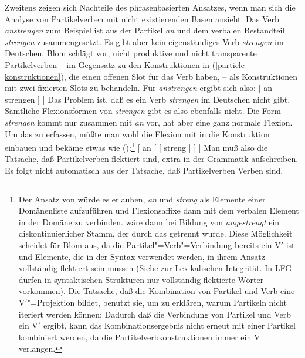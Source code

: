 Zweitens zeigen sich Nachteile des phrasenbasierten Ansatzes, wenn man sich
die Analyse von Partikelverben mit nicht existierenden Basen ansieht:
Das Verb \emph{anstrengen} zum Beispiel ist aus der Partikel \emph{an}
und dem verbalen Bestandteil \emph{strengen} zusammengesetzt. Es gibt
aber kein eigenständiges Verb \emph{strengen} im Deutschen. Blom
schlägt vor, nicht produktive und nicht transparente Partikelverben
-- im Gegensatz zu den Konstruktionen in (\ref{particle-konstruktionen}),
die einen offenen Slot für das Verb haben, -- als Konstruktionen mit zwei
fixierten Slots zu behandeln. Für \emph{anstrengen} ergibt sich also:
\ea 
{}[ an   [ strengen ] ]
\z
Das Problem ist, daß es ein Verb \emph{strengen} im Deutschen nicht gibt.
Sämtliche Flexionsformen von \emph{strengen} gibt es also ebenfalls nicht.
Die Form \emph{strengen} kommt nur zusammen mit \emph{an} vor, hat aber eine
ganz normale Flexion. Um das zu erfassen, müßte man wohl die Flexion mit in
die Konstruktion einbauen und bekäme etwas wie ():\footnote{
  Der Ansatz von \citet{Crysmann2002a} würde es erlauben, \emph{an} und
  \emph{streng} als Elemente einer Domänenliste aufzuführen und Flexionsaffixe
  dann mit dem verbalen Element in der Domäne zu verbinden. 
  wäre dann bei Bildung von \emph{angestrengt} ein diskontinuierlicher
  Stamm, der durch das  getrennt wurde. Diese Möglichkeit scheidet
  für Blom aus, da die Partikel"=Verb"=Verbindung bereits ein V$'$ ist
  und Elemente, die in der Syntax verwendet werden, in ihrem Ansatz
  vollständig flektiert sein müssen (Siehe  zur Lexikalischen
  Integrität. In LFG dürfen in syntaktischen Strukturen nur vollständig flektierte Wörter vorkommen). 
  Die Tatsache, daß die Kombination von Partikel und Verb eine V$'$"=Projektion bildet, benutzt sie, um zu
  erklären, warum Partikeln nicht iteriert werden können: Dadurch daß
  die Verbindung von Partikel und Verb ein V$'$ ergibt, kann das Kombinationsergebnis
  nicht erneut mit einer Partikel kombiniert werden, da die Partikelverbkonstruktionen
  immer ein V verlangen.%
}
\ea 
{}[ an   [ [ streng ] ] ]
\z
Man muß also die Tatsache, daß Partikelverben flektiert sind, extra in der Grammatik
aufschreiben. Es folgt nicht automatisch aus der Tatsache, daß Partikelverben Verben sind.

